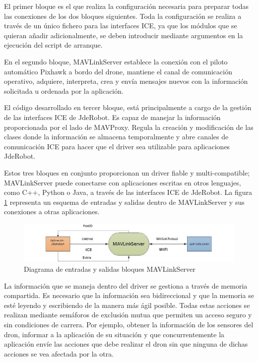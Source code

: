 El primer bloque es el que realiza la configuración necesaria para preparar todas las conexiones de los dos bloques siguientes. Toda la configuración se realiza a través de un único fichero para las interfaces ICE, ya que los módulos que se quieran añadir adicionalmente, se deben introducir mediante argumentos en la ejecución del script de arranque.

En el segundo bloque, MAVLinkServer establece la conexión con el piloto automático Pixhawk a bordo del drone, mantiene el canal de comunicación operativo, adquiere, interpreta, crea y envía mensajes nuevos con la información solicitada u ordenada por la aplicación.

El código desarrollado en tercer bloque, está principalmente a cargo de la gestión de las interfaces ICE de JdeRobot. Es capaz de manejar la información proporcionada por el lado de MAVProxy. Regula la creación y modificación de las clases donde la información se almacena temporalmente y abre canales de comunicación ICE para hacer que el driver sea utilizable para aplicaciones JdeRobot.

Estos tres bloques en conjunto proporcionan un driver fiable y multi-compatible; MAVLinkServer puede conectarse con aplicaciones escritas en otros lenguajes, como C++, Python o Java, a través de las interfaces ICE de JdeRobot. La figura \ref{fig:mavLinkJdeRobotNegra} representa un esquema de entradas y salidas dentro de MAVLinkServer y sus conexiones a otras aplicaciones.


\begin{figure}[H]
  \centering
  \includegraphics[scale=0.65]{imagenes/cajaNegraNueva.png}
  \caption{Diagrama de entradas y salidas bloques MAVLinkServer}
  \label{fig:mavLinkJdeRobotNegra}
\end{figure}

La información que se maneja dentro del driver se gestiona a través de memoria compartida. Es necesario que la información sea bidireccional y que la memoria se esté leyendo y escribiendo de la manera más ágil posible. Todas estas acciones se realizan mediante semáforos de exclusión mutua que permiten un acceso seguro y sin condiciones de carrera. Por ejemplo, obtener la información de los sensores del dron, informar a la aplicación de su situación y que concurrentemente la aplicación envíe las acciones que debe realizar el dron sin que ninguna de dichas acciones se vea afectada por la otra.

